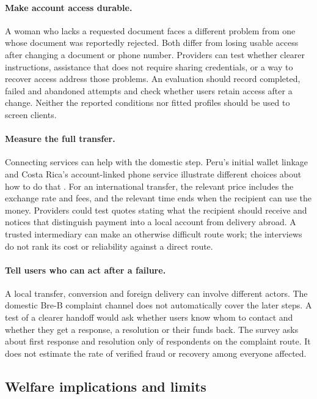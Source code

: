 \paragraph{Make account access durable.} A woman who lacks a requested document faces a different problem from one whose document was reportedly rejected. Both differ from losing usable access after changing a document or phone number. Providers can test whether clearer instructions, assistance that does not require sharing credentials, or a way to recover access address those problems. An evaluation should record completed, failed and abandoned attempts and check whether users retain access after a change. Neither the reported conditions nor fitted profiles should be used to screen clients.

\paragraph{Measure the full transfer.} Connecting services can help with the domestic step. Peru's initial wallet linkage and Costa Rica's account-linked phone service illustrate different choices about how to do that \citep{bcrp2025,bccrsinpe}. For an international transfer, the relevant price includes the exchange rate and fees, and the relevant time ends when the recipient can use the money. Providers could test quotes stating what the recipient should receive and notices that distinguish payment into a local account from delivery abroad. A trusted intermediary can make an otherwise difficult route work; the interviews do not rank its cost or reliability against a direct route.

\paragraph{Tell users who can act after a failure.} A local transfer, conversion and foreign delivery can involve different actors. The domestic Bre-B complaint channel does not automatically cover the later steps. A test of a clearer handoff would ask whether users know whom to contact and whether they get a response, a resolution or their funds back. The survey asks about first response and resolution only of respondents on the complaint route. It does not estimate the rate of verified fraud or recovery among everyone affected.

\subsection{Welfare implications and limits}

